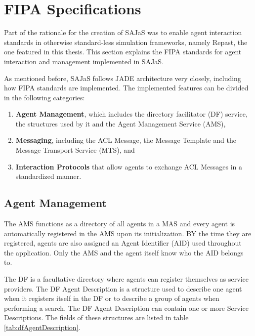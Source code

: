 \section{FIPA Specifications}
\label{sec:solution-fipa}

Part of the rationale for the creation of SAJaS was to enable agent interaction standards in otherwise standard-less simulation frameworks, namely Repast, the one featured in this thesis. This section explains the FIPA standards for agent interaction and management implemented in SAJaS.

As mentioned before, SAJaS follows JADE architecture very closely, including how FIPA standards are implemented. The implemented features can be divided in the following categories:

\begin{enumerate}
  \item \textbf{Agent Management}, which includes the directory facilitator (DF) service, the structures used by it and the Agent Management Service (AMS),
  \item \textbf{Messaging}, including the ACL Message, the Message Template and the Message Transport Service (MTS), and
  \item \textbf{Interaction Protocols} that allow agents to exchange ACL Messages in a standardized manner.
\end{enumerate}

\subsection{Agent Management}
The AMS functions as a directory of all agents in a MAS and every agent is automatically registered in the AMS upon its initialization. BY the time they are registered, agents are also assigned an Agent Identifier (AID) used throughout the application. Only the AMS and the agent itself know who the AID belongs to.

The DF is a facultative directory where agents can register themselves as service providers. The DF Agent Description is a structure used to describe one agent when it registers itself in the DF or to describe a group of agents when performing a search. The DF Agent Description can contain one or more Service Descriptions. The fields of these structures are listed in table \ref{tab:dfAgentDescription}.


